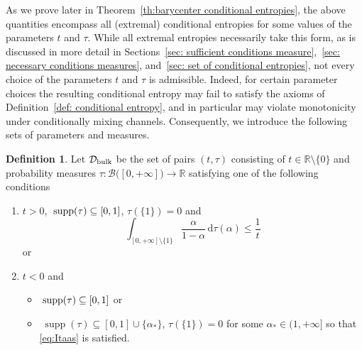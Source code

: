 \documentclass[aps,pra,11pt,onecolumn,nofootinbib,tightenlines]{revtex4-2}
\theoremstyle{definition}
\newtheorem{definition}[theorem]{Definition}
\newcommand{\D}{\mathcal{D}}
\newcommand{\R}{\mathbb{R}}
\newcommand{\mc}[1]{\mathcal{#1}}
\newcommand{\mb}[1]{\mathbb{#1}}
\begin{document}
As we prove later in Theorem~\ref{th:barycenter conditional entropies}, the above quantities encompass all (extremal) conditional entropies for some values of the parameters $t$ and $\tau$. While all extremal entropies necessarily take this form, as is discussed in more detail in Sections~\ref{sec: sufficient conditions measure},~\ref{sec: necessary conditions measures}, and~\ref{sec: set of conditional entropies}, not every choice of the parameters \(t\) and \(\tau\) is admissible. Indeed, for certain parameter choices the resulting conditional entropy may fail to satisfy the axioms of Definition~\ref{def: conditional entropy}, and in particular may violate monotonicity under conditionally mixing channels. 
Consequently, we introduce the following sets of parameters and measures.



\begin{definition}
\label{def: D}
Let \(\D_{\rm{bulk}}\) be the set of pairs $(t,\tau)$ consisting of $t\in\R\setminus\{0\}$ and probability measures $\tau:\mc B\big([0,+\infty]\big)\to\mb R$ satisfying one of the following conditions
\begin{enumerate}[itemsep=0pt,topsep=5pt]
    \item $t > 0$, $\;\textup{supp}(\tau) \subseteq [0,1]$, $\tau(\{1\})=0$ and
    \begin{equation}\label{eq:Itaas}
    \int_{[0,+\infty]\setminus\{1\}}\frac{\alpha}{1-\alpha}\,\mathrm{d}\tau(\alpha)\leq\frac{1}{t}
    \end{equation}
    or
    \item $t < 0$ and
    \begin{itemize}
    \item[(a)] $\;\textup{supp}(\tau) \subseteq [0,1]$ or
    \item[(b)] $\;\operatorname{supp}(\tau) \subseteq [0,1] \cup \{\alpha_*\}$, $\tau(\{1\})=0$ for some $\alpha_* \in (1, +\infty]$ so that \eqref{eq:Itaas} is satisfied.
    \end{itemize}
\end{enumerate}
\end{definition}
\end{document}

